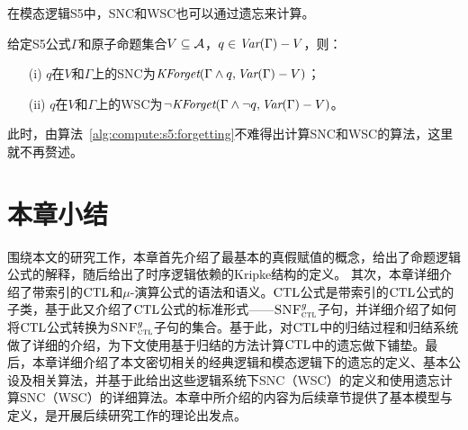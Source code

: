 在模态逻辑S5中，SNC和WSC也可以通过遗忘来计算。
\begin{theorem}\label{thm:S5:SNC}
	给定S5公式$\Gamma$和原子命题集合$V\subseteq {\cal A}$，$q\in \textit{Var}(\Gamma) -V$，则：
	\begin{itemize}
		\item[(i)]  $q$在$V$和$\Gamma$上的SNC为$\textit{KForget}(\Gamma \wedge q, \textit{Var}(\Gamma)-V)$；
		\item[(ii)] $q$在$V$和$\Gamma$上的WSC为$\neg \textit{KForget}(\Gamma \wedge \neg q, \textit{Var}(\Gamma)-V)$。
	\end{itemize}
\end{theorem}
此时，由算法~\ref{alg:compute:s5:forgetting}不难得出计算SNC和WSC的算法，这里就不再赘述。


\section{本章小结}
围绕本文的研究工作，本章首先介绍了最基本的真假赋值的概念，给出了命题逻辑公式的解释，随后给出了时序逻辑依赖的Kripke结构的定义。
其次，本章详细介绍了带索引的$\textrm{CTL}$和$\mu$-演算公式的语法和语义。$\textrm{CTL}$公式是带索引的$\textrm{CTL}$公式的子类，基于此又介绍了$\textrm{CTL}$公式的标准形式——${\textsc{SNF}_{\textsc{ctl}}^g}$子句，并详细介绍了如何将$\textrm{CTL}$公式转换为${\textsc{SNF}_{\textsc{ctl}}^g}$子句的集合。基于此，对$\textrm{CTL}$中的归结过程和归结系统做了详细的介绍，为下文使用基于归结的方法计算$\textrm{CTL}$中的遗忘做下铺垫。最后，本章详细介绍了本文密切相关的经典逻辑和模态逻辑下的遗忘的定义、基本公设及相关算法，并基于此给出这些逻辑系统下SNC（WSC）的定义和使用遗忘计算SNC（WSC）的详细算法。本章中所介绍的内容为后续章节提供了基本模型与定义，是开展后续研究工作的理论出发点。


